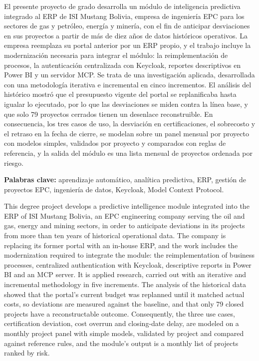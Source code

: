 \documentclass{univalle-perfil}
\begin{document}
El presente proyecto de grado desarrolla un módulo de inteligencia predictiva integrado al ERP de ISI Mustang Bolivia, empresa de ingeniería EPC para los sectores de gas y petróleo, energía y minería, con el fin de anticipar desviaciones en sus proyectos a partir de más de diez años de datos históricos operativos. La empresa reemplaza su portal anterior por un ERP propio, y el trabajo incluye la modernización necesaria para integrar el módulo: la reimplementación de procesos, la autenticación centralizada con Keycloak, reportes descriptivos en Power BI y un servidor MCP\@. Se trata de una investigación aplicada, desarrollada con una metodología iterativa e incremental en cinco incrementos. El análisis del histórico mostró que el presupuesto vigente del portal se replanificaba hasta igualar lo ejecutado, por lo que las desviaciones se miden contra la línea base, y que solo 79 proyectos cerrados tienen un desenlace reconstruible. En consecuencia, los tres casos de uso, la desviación en certificaciones, el sobrecosto y el retraso en la fecha de cierre, se modelan sobre un panel mensual por proyecto con modelos simples, validados por proyecto y comparados con reglas de referencia, y la salida del módulo es una lista mensual de proyectos ordenada por riesgo. %

\textbf{Palabras clave:} aprendizaje automático, analítica predictiva, ERP, gestión de proyectos EPC, ingeniería de datos, Keycloak, Model Context Protocol.

This degree project develops a predictive intelligence module integrated into the ERP of ISI Mustang Bolivia, an EPC engineering company serving the oil and gas, energy and mining sectors, in order to anticipate deviations in its projects from more than ten years of historical operational data. The company is replacing its former portal with an in-house ERP, and the work includes the modernization required to integrate the module: the reimplementation of business processes, centralized authentication with Keycloak, descriptive reports in Power BI and an MCP server. It is applied research, carried out with an iterative and incremental methodology in five increments. The analysis of the historical data showed that the portal's current budget was replanned until it matched actual costs, so deviations are measured against the baseline, and that only 79 closed projects have a reconstructable outcome. Consequently, the three use cases, certification deviation, cost overrun and closing-date delay, are modeled on a monthly project panel with simple models, validated by project and compared against reference rules, and the module's output is a monthly list of projects ranked by risk. %
\end{document}
